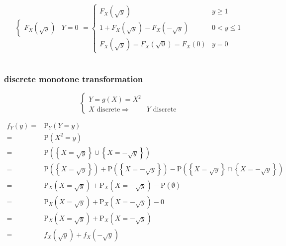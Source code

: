 \documentclass[
]{book}
\theoremstyle{definition}
\theoremstyle{definition}
\theoremstyle{definition}
\theoremstyle{definition}
\theoremstyle{remark}
\begin{document}
\[\begin{aligned}
\begin{cases}
F_{{\scriptscriptstyle X}}\left(\sqrt{y}\right) & Y=0
\end{cases}=\begin{cases}
F_{{\scriptscriptstyle X}}\left(\sqrt{y}\right) & y\ge1\\
1+F_{{\scriptscriptstyle X}}\left(\sqrt{y}\right)-F_{{\scriptscriptstyle X}}\left(-\sqrt{y}\right) & 0<y\le1\\
F_{{\scriptscriptstyle X}}\left(\sqrt{y}\right)=F_{{\scriptscriptstyle X}}\left(\sqrt{0}\right)=F_{{\scriptscriptstyle X}}\left(0\right) & y=0
\end{cases}
\end{aligned}
\]

\[
\tag*{$\Box$}
\]

\subsubsection{discrete monotone transformation}\label{discrete-monotone-transformation}

\[
\begin{cases}
Y=g\left(X\right)=X^{2}\\
X\text{ discrete}\Rightarrow & Y\text{ discrete}
\end{cases}
\]

\[
\begin{aligned}
f_{{\scriptscriptstyle Y}}\left(y\right)= & \mathrm{P}_{{\scriptscriptstyle Y}}\left(Y=y\right)\\
= & \mathrm{P}\left(X^{2}=y\right)\\
= & \mathrm{P}\left(\left\{ X=\sqrt{y}\right\} \cup\left\{ X=-\sqrt{y}\right\} \right)\\
= & \mathrm{P}\left(\left\{ X=\sqrt{y}\right\} \right)+\mathrm{P}\left(\left\{ X=-\sqrt{y}\right\} \right)-\mathrm{P}\left(\left\{ X=\sqrt{y}\right\} \cap\left\{ X=-\sqrt{y}\right\} \right)\\
= & \mathrm{P}_{{\scriptscriptstyle X}}\left(X=\sqrt{y}\right)+\mathrm{P}_{{\scriptscriptstyle X}}\left(X=-\sqrt{y}\right)-\mathrm{P}\left(\emptyset\right)\\
= & \mathrm{P}_{{\scriptscriptstyle X}}\left(X=\sqrt{y}\right)+\mathrm{P}_{{\scriptscriptstyle X}}\left(X=-\sqrt{y}\right)-0\\
= & \mathrm{P}_{{\scriptscriptstyle X}}\left(X=\sqrt{y}\right)+\mathrm{P}_{{\scriptscriptstyle X}}\left(X=-\sqrt{y}\right)\\
= & f_{{\scriptscriptstyle X}}\left(\sqrt{y}\right)+f_{{\scriptscriptstyle X}}\left(-\sqrt{y}\right)
\end{aligned}
\]
\end{document}
